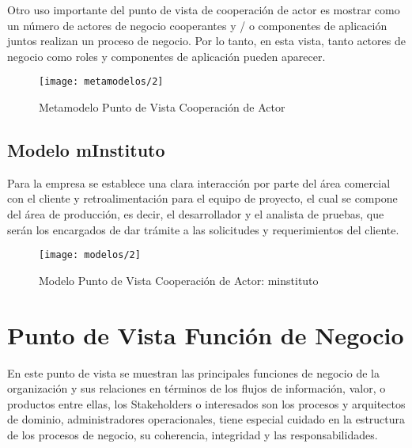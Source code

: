   Otro uso importante del punto de vista de cooperación de actor es mostrar como un número de actores de negocio cooperantes y / o componentes de aplicación juntos realizan un proceso de negocio. Por lo tanto, en esta vista, tanto actores de negocio como roles y componentes de aplicación pueden aparecer. \cite{ref9}
  
  \begin{figure}[H]
  	\centering
  	\texttt{[image: metamodelos/2]}
  	\captionsetup{width=.95\textwidth}
  	\caption{Metamodelo Punto de Vista Cooperación de Actor \cite{ref9}}
  	\label{metamodelo2}
  \end{figure}
  
  \subsection{Modelo mInstituto}
  Para la empresa se establece una clara interacción por parte del área comercial con el cliente y retroalimentación para el equipo de proyecto, el cual se compone del área de producción, es decir, el desarrollador y el analista de pruebas, que serán los encargados de dar trámite a las solicitudes y requerimientos del cliente.
  
  \begin{figure}[H]
  	\centering
  	\texttt{[image: modelos/2]}
  	\captionsetup{width=.95\textwidth}
  	\caption{Modelo Punto de Vista Cooperación de Actor: minstituto}
  	\label{modelo2}
  \end{figure}
 
  \section{Punto de Vista Función de Negocio}
  En este punto de vista se muestran las principales funciones de negocio de la organización y sus relaciones en términos de los flujos de información, valor, o productos entre ellas, los Stakeholders o interesados son los procesos y arquitectos de dominio, administradores operacionales, tiene especial cuidado en la estructura de los procesos de negocio, su coherencia, integridad y las responsabilidades. \cite{ref9}

